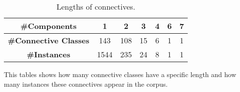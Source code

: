 \begin{table}[ht]
\centering
\begin{tabular}{|c|c|c|c|c|c|c|}
\hline
\bf \#Components         & 1    & 2   & 3  & 4 & 6 & 7 \\ \hline
\bf \#Connective Classes & 143  & 108 & 15 & 6 & 1 & 1 \\ \hline
\bf \#Instances          & 1544 & 235 & 24 & 8 & 1 & 1 \\ \hline
\end{tabular}
\caption{\label{t:connective-length} Lengths of connectives.}
This tables shows how many connective classes have a specific length
and how many instances these connectives appear in the corpus.
\end{table}
